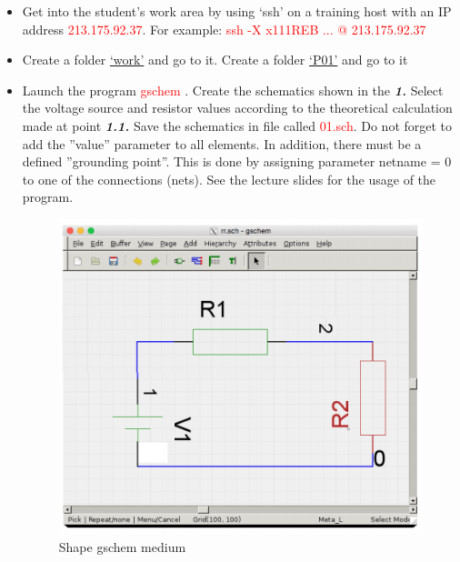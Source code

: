 \documentclass{report}
\begin{document}
	\begin{itemize}
		\item Get into the student’s work area by using ‘ssh’ on a training host with an IP address
		\textcolor{red}{213.175.92.37}. For example: \textcolor{red}{ssh -X x111REB ... @ 213.175.92.37}
		\item Create a folder \underline{‘work’} and go to it. Create a folder \underline{‘P01’} and go to it
		
		\item Launch the program \textcolor{red}{gschem} . Create the schematics shown in the \textbf{\textit{1. }}Select the voltage
		source and resistor values according to the theoretical calculation made at point \textbf{\textit{1.1.}}
		Save the schematics in file called \textcolor{red}{01.sch}. Do not forget to add the ”value” parameter
		to all elements. In addition, there must be a defined ”grounding point”. This is done by
		assigning parameter netname = 0 to one of the connections (nets). See the lecture slides
		for the usage of the program. \cite{firstRef}
		
		\begin{figure}[ht]
			\includegraphics{Figures/one}
			\caption{Shape gschem medium}
			\label{fig:figure1}
		\end{figure}
		

\end{itemize}
\end{document}
